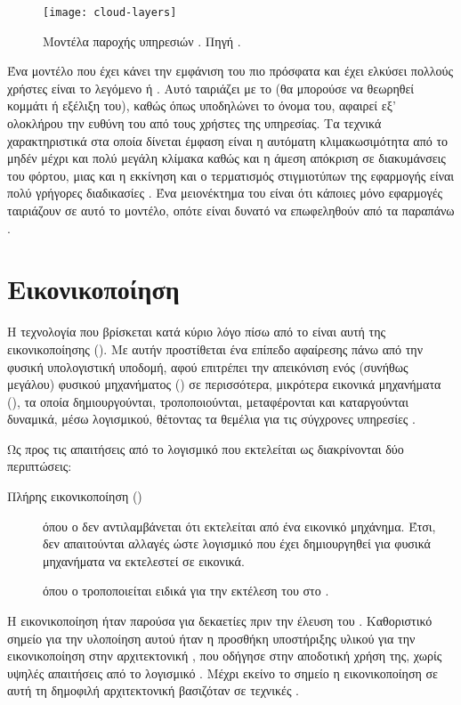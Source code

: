 \begin{figure}
    \centering
    \texttt{[image: cloud-layers]}
    \caption[Μοντέλα παροχής υπηρεσιών ]{Μοντέλα παροχής υπηρεσιών
        . Πηγή
        .}
    \label{fig:cloud}
\end{figure}

Ένα μοντέλο που έχει κάνει την εμφάνιση του πιο πρόσφατα και έχει ελκύσει
πολλούς χρήστες είναι το λεγόμενο  ή . Αυτό ταιριάζει με το  (θα μπορούσε να θεωρηθεί κομμάτι ή
εξέλιξη του), καθώς όπως υποδηλώνει το όνομα του, αφαιρεί εξ' ολοκλήρου την
ευθύνη του  από τους χρήστες της υπηρεσίας. Τα τεχνικά χαρακτηριστικά
στα οποία δίνεται έμφαση είναι η αυτόματη κλιμακωσιμότητα από το μηδέν μέχρι και
πολύ μεγάλη κλίμακα καθώς και η άμεση απόκριση σε διακυμάνσεις του φόρτου,
μιας και η εκκίνηση και ο τερματισμός στιγμιοτύπων της εφαρμογής είναι πολύ
γρήγορες διαδικασίες \cite{cloudflare-serverless}. Ένα μειονέκτημα του
 είναι ότι κάποιες μόνο εφαρμογές ταιριάζουν σε αυτό το μοντέλο,
οπότε είναι δυνατό να επωφεληθούν από τα παραπάνω \cite{serverless,
spec-serverless}.

\section{Εικονικοποίηση}

Η τεχνολογία που βρίσκεται κατά κύριο λόγο πίσω από το  είναι αυτή της
εικονικοποίησης (). Με αυτήν προστίθεται ένα επίπεδο
αφαίρεσης πάνω από την φυσική υπολογιστική υποδομή, αφού επιτρέπει την
απεικόνιση ενός (συνήθως μεγάλου) φυσικού μηχανήματος () σε
περισσότερα, μικρότερα εικονικά μηχανήματα (), τα
οποία δημιουργούνται, τροποποιούνται, μεταφέρονται και καταργούνται δυναμικά,
μέσω λογισμικού, θέτοντας τα θεμέλια για τις σύγχρονες υπηρεσίες 
\cite{wiki:hw-virtualization}.

Ως προς τις απαιτήσεις από το λογισμικό που εκτελείται ως \guest{} διακρίνονται
δύο περιπτώσεις:
\begin{description}
    \item[Πλήρης εικονικοποίηση ()] όπου ο \guest{} δεν
          αντιλαμβάνεται ότι εκτελείται από ένα εικονικό μηχάνημα. Έτσι, δεν
          απαιτούνται αλλαγές ώστε λογισμικό που έχει δημιουργηθεί για φυσικά
          μηχανήματα να εκτελεστεί σε εικονικά.
    \item[] όπου ο \guest{} τροποποιείται ειδικά για την
          εκτέλεση του στο .
\end{description}
Η εικονικοποίηση ήταν παρούσα για δεκαετίες πριν την έλευση του .
Καθοριστικό σημείο για την υλοποίηση αυτού ήταν η προσθήκη υποστήριξης υλικού
για την εικονικοποίηση στην αρχιτεκτονική , που οδήγησε στην αποδοτική
χρήση της, χωρίς υψηλές απαιτήσεις από το λογισμικό \cite{virtualization-x86}.
Μέχρι εκείνο το σημείο η εικονικοποίηση σε αυτή τη δημοφιλή αρχιτεκτονική
βασιζόταν σε τεχνικές .

